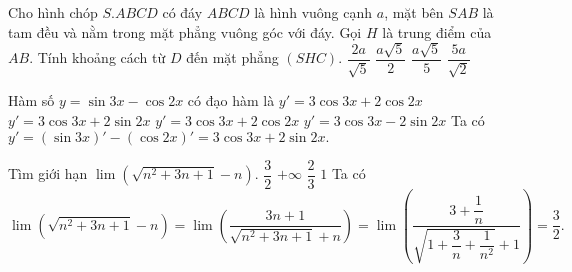 \begin{ex}%
	Cho hình chóp $S.ABCD$ có đáy $ABCD$ là hình vuông cạnh $a$, mặt bên $SAB$ là tam đều và nằm trong mặt phẳng vuông góc với đáy. Gọi $H$ là trung điểm của $AB$. Tính khoảng cách từ $D$ đến mặt phẳng $(SHC).$
	\choice
	{\True $\dfrac{2a}{\sqrt{5}}$}
	{ $\dfrac{a\sqrt{5}}{2}$}
	{$\dfrac{a\sqrt{5}}{5}$}
	{$\dfrac{5a}{\sqrt{2}}$}
	\loigiai
	{ 
	}
\end{ex}
\begin{ex}%
	Hàm số $y=\sin {3x}-\cos {2x}$ có đạo hàm là
	\choice
	{$y'=3 \cos {3x}+2 \cos {2x}$}
	{\True $y'=3 \cos {3x}+2 \sin {2x}$}
	{$y'=3 \cos {3x}+2 \cos {2x}$}
	{ $y'=3 \cos {3x}-2\sin {2x}$}
	\loigiai
	{ Ta có $y'=\left(\sin {3x}\right)'-\left(\cos {2x}\right)' =3 \cos {3x}+2 \sin {2x}.$ 
	}
\end{ex}
\begin{ex}%
	Tìm giới hạn $ \lim\limits \left( \sqrt{n^2+3n+1}-n\right).$
	\choice
	{\True $\dfrac{3}{2}$}
	{$+ \infty $}
	{$\dfrac{2}{3}$}
	{$1$}
	\loigiai
	{ Ta có 
		$$\lim\limits \left( \sqrt{n^2+3n+1}-n\right)= \lim\limits \left( \dfrac{3n+1}{\sqrt{n^2+3n+1}+n}\right)= \lim\limits \left( \dfrac{3+\dfrac{1}{n}}{\sqrt{1+\dfrac{3}{n}+\dfrac{1}{n^2}}+1}\right) = \dfrac{3}{2}.$$
	}
\end{ex}
